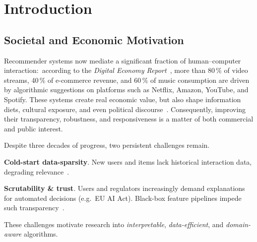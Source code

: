 \doublespacing


\chapter{Introduction}
\label{ch:intro}

\section{Societal and Economic Motivation}
Recommender systems now mediate a significant fraction of human–computer interaction:\ according to the \emph{Digital Economy Report}~\cite{UNCTAD2024DER}, more than 80\,\% of video streams, 40\,\% of e-commerce revenue, and 60\,\% of music consumption are driven by algorithmic suggestions on platforms such as Netflix, Amazon, YouTube, and Spotify.  These systems create real economic value, but also shape information diets, cultural exposure, and even political discourse~\cite{Helberger2022RecSysSociety}.  Consequently, improving their transparency, robustness, and responsiveness is a matter of both commercial and public interest.

Despite three decades of progress, two persistent challenges remain.
\begin{enumerate*}
  \item \textbf{Cold-start \/ data-sparsity}.  New users and items lack historical interaction data, degrading relevance~\cite{Schein2002ColdStart,Linden2003Amazon}.
  \item \textbf{Scrutability \& trust}.  Users and regulators increasingly demand explanations for automated decisions (e.g.~EU AI Act).  Black-box feature pipelines impede such transparency~\cite{Tintarev2023ExplainableRS}.
\end{enumerate*}
These challenges motivate research into \emph{interpretable}, \emph{data-efficient}, and \emph{domain-aware} algorithms.

